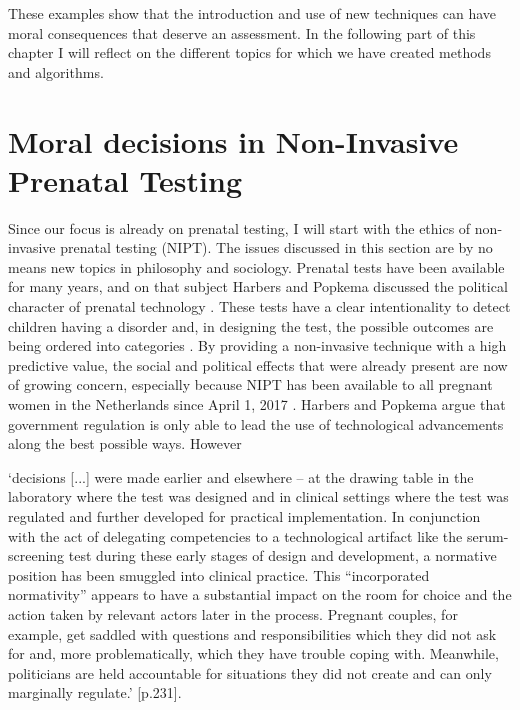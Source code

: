 These examples show that the introduction and use of new techniques can have moral consequences that deserve an assessment. 
In the following part of this chapter I will reflect on the different topics for which we have created methods and algorithms. 

\section[Moral decisions in Non-Invasive Prenatal Testing]{Moral decisions in Non-Invasive Prenatal \newline Testing}             
Since our focus is already on prenatal testing, I will start with the ethics of non-invasive prenatal testing (NIPT). 
The issues discussed in this section are by no means new topics in philosophy and sociology. 
Prenatal tests have been available for many years, and on that subject Harbers and Popkema discussed the political character of prenatal technology \cite{Harbers_2005}. 
These tests have a clear intentionality to detect children having a disorder and, in designing the test, the possible outcomes are being ordered into categories \cite{Stephenson_2017}. 
By providing a non-invasive technique with a high predictive value, the social and political effects that were already present are now of growing concern, especially because NIPT has been available to all pregnant women in the Netherlands since April 1, 2017 \cite{niptconsortium_2017a}. 
Harbers and Popkema argue that government regulation is only able to lead the use of technological advancements along the best possible ways. 
However \newline 

\hfill\begin{minipage}{\dimexpr\textwidth-1cm}
‘decisions [...] were made earlier and elsewhere – at the drawing table in the laboratory where the test was designed and in clinical settings where the test was regulated and further developed for practical implementation. 
In conjunction with the act of delegating competencies to a technological artifact like the serum-screening test during these early stages of design and development, a normative position has been smuggled into clinical practice.
This “incorporated normativity” appears to have a substantial impact on the room for choice and the action taken by relevant actors later in the process.
Pregnant couples, for example, get saddled with questions and responsibilities which they did not ask for and, more problematically, which they have trouble coping with.  
Meanwhile, politicians are held accountable for situations they did not create and can only marginally regulate.’ \cite{Harbers_2005}[p.231].
\end{minipage} \newline \newline

